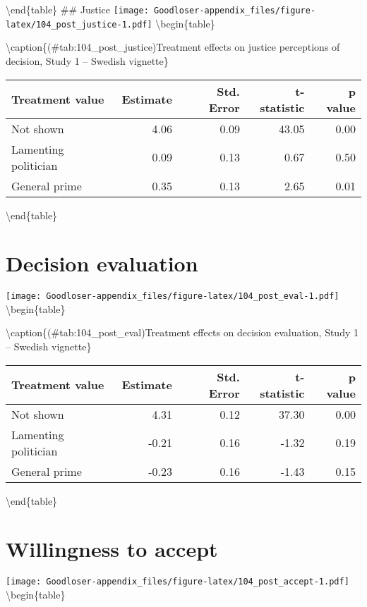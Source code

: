 \documentclass[
]{book}
\begin{document}
\textbackslash end\{table\}
\#\# Justice
\texttt{[image: Goodloser-appendix\_files/figure-latex/104\_post\_justice-1.pdf]} \textbackslash begin\{table\}

\textbackslash caption\{(\#tab:104\_post\_justice)Treatment effects on justice perceptions of decision, Study 1 -- Swedish vignette\}
\centering

\begin{tabular}[t]{lrrrr}
\toprule
Treatment value & Estimate & Std. Error & t-statistic & p value\\
\midrule
Not shown & 4.06 & 0.09 & 43.05 & 0.00\\
Lamenting politician & 0.09 & 0.13 & 0.67 & 0.50\\
General prime & 0.35 & 0.13 & 2.65 & 0.01\\
\bottomrule
\end{tabular}

\textbackslash end\{table\}

\hypertarget{decision-evaluation}{%
\section{Decision evaluation}\label{decision-evaluation}}

\texttt{[image: Goodloser-appendix\_files/figure-latex/104\_post\_eval-1.pdf]} \textbackslash begin\{table\}

\textbackslash caption\{(\#tab:104\_post\_eval)Treatment effects on decision evaluation, Study 1 -- Swedish vignette\}
\centering

\begin{tabular}[t]{lrrrr}
\toprule
Treatment value & Estimate & Std. Error & t-statistic & p value\\
\midrule
Not shown & 4.31 & 0.12 & 37.30 & 0.00\\
Lamenting politician & -0.21 & 0.16 & -1.32 & 0.19\\
General prime & -0.23 & 0.16 & -1.43 & 0.15\\
\bottomrule
\end{tabular}

\textbackslash end\{table\}

\hypertarget{willingness-to-accept}{%
\section{Willingness to accept}\label{willingness-to-accept}}

\texttt{[image: Goodloser-appendix\_files/figure-latex/104\_post\_accept-1.pdf]} \textbackslash begin\{table\}
\end{document}

